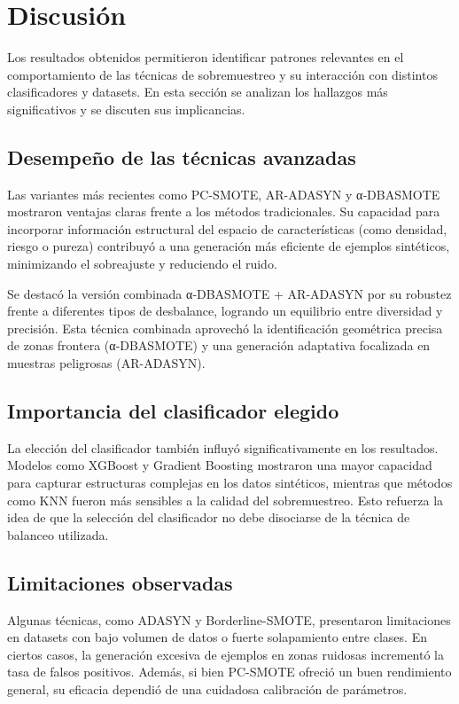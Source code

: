 \section{Discusión}

Los resultados obtenidos permitieron identificar patrones relevantes en el comportamiento de las técnicas de sobremuestreo y su interacción con distintos clasificadores y datasets. En esta sección se analizan los hallazgos más significativos y se discuten sus implicancias.

\subsection{Desempeño de las técnicas avanzadas}

Las variantes más recientes como PC-SMOTE, AR-ADASYN y α‑DBASMOTE mostraron ventajas claras frente a los métodos tradicionales. Su capacidad para incorporar información estructural del espacio de características (como densidad, riesgo o pureza) contribuyó a una generación más eficiente de ejemplos sintéticos, minimizando el sobreajuste y reduciendo el ruido.

Se destacó la versión combinada α‑DBASMOTE + AR‑ADASYN por su robustez frente a diferentes tipos de desbalance, logrando un equilibrio entre diversidad y precisión. Esta técnica combinada aprovechó la identificación geométrica precisa de zonas frontera (α‑DBASMOTE) y una generación adaptativa focalizada en muestras peligrosas (AR-ADASYN).

\subsection{Importancia del clasificador elegido}

La elección del clasificador también influyó significativamente en los resultados. Modelos como XGBoost y Gradient Boosting mostraron una mayor capacidad para capturar estructuras complejas en los datos sintéticos, mientras que métodos como KNN fueron más sensibles a la calidad del sobremuestreo. Esto refuerza la idea de que la selección del clasificador no debe disociarse de la técnica de balanceo utilizada.

\subsection{Limitaciones observadas}

Algunas técnicas, como ADASYN y Borderline-SMOTE, presentaron limitaciones en datasets con bajo volumen de datos o fuerte solapamiento entre clases. En ciertos casos, la generación excesiva de ejemplos en zonas ruidosas incrementó la tasa de falsos positivos. Además, si bien PC-SMOTE ofreció un buen rendimiento general, su eficacia dependió de una cuidadosa calibración de parámetros.


